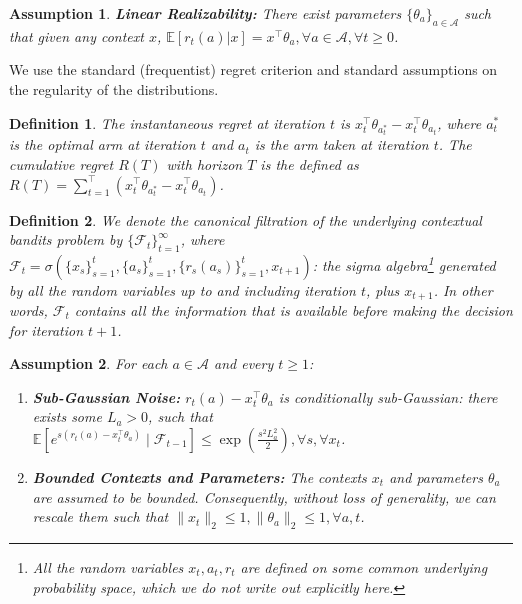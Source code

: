 \documentclass[letterpaper]{article} %
\newtheorem{assumption}{Assumption}
\newtheorem{definition}{Definition}
\def\A{\mathcal{A}}
\begin{document}
\begin{assumption}\label{assump:realizability}
\textbf{Linear Realizability:}
There exist parameters $\{\theta_a\}_{a\in \A}$ such that given any context $x$, $\mathbb{E}[r_t(a) | x] = x^\top \theta_a, \forall a \in \A, \forall t \ge 0$.
\end{assumption}

We use the standard (frequentist) regret criterion and standard assumptions on the regularity of the distributions.
\begin{definition}
The instantaneous regret at iteration $t$ is $x^\top_t \theta_{a_t^*} -  x^\top_t \theta_{a_t}$,
where $a^*_t$ is the optimal arm at iteration $t$ and $a_t$ is the arm taken at iteration $t$.
The cumulative regret $R(T)$ with horizon $T$ is the defined as $R(T) = \sum_{t=1}^\top \left(x^\top_t \theta_{a_t^*} -  x^\top_t \theta_{a_t}\right)$.
\end{definition}

\begin{definition}
We denote the canonical filtration of the underlying contextual bandits problem by $\{\mathcal{F}_t\}_{t=1}^{\infty}$, where $\mathcal{F}_t = \sigma(\{x_s\}_{s=1}^t, \{a_s\}_{s=1}^t, \{r_s(a_s)\}_{s=1}^t, x_{t+1})$: the sigma algebra\footnote{All the random variables $x_t, a_t, r_t$ are defined on some common underlying probability space, which we do not write out explicitly here.} generated by all the random variables up to and including iteration $t$, plus $x_{t+1}$. In other words, $\mathcal{F}_t$ contains all the information that is available before making the decision for iteration $t+1$.
\end{definition}

\begin{assumption}\label{assump:reg}
For each $a \in \A$ and every $t \ge 1$:
\begin{enumerate}
\item
\textbf{Sub-Gaussian Noise:}
$r_t(a) - x_t^\top\theta_a$ is conditionally sub-Gaussian:
there exists some $L_a > 0$, such that
$\mathbb{E} [e^{s(r_t(a) - x_t^\top\theta_a)} \mid \mathcal{F}_{t-1}] \le \exp(\frac{s^2 L_a^2}{2}), \forall s, \forall x_t$.
\item
\textbf{Bounded Contexts and Parameters:}
The contexts $x_t$ and parameters $\theta_a$ are assumed to be bounded.
Consequently, without loss of generality, we can rescale them such that
$\|x_t\|_2 \le 1, \|\theta_a\|_2 \le 1, \forall a, t$.
\end{enumerate}

\end{assumption}
\end{document}
